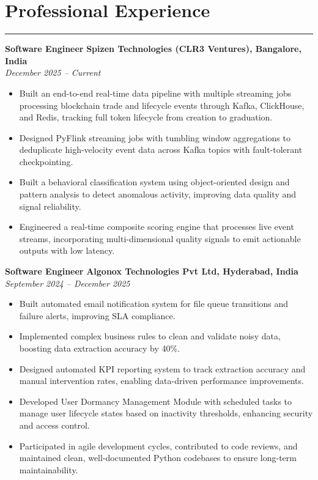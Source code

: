 \documentclass[12pt]{article}
\begin{document}
\section*{Professional Experience}
\vspace{1pt}\hrule\vspace{4pt}

\textbf{Software Engineer} \hfill \textbf{Spizen Technologies (CLR3 Ventures), Bangalore, India} \\
\textit{December 2025 -- Current}
\begin{itemize}
  \item Built an end-to-end real-time data pipeline with multiple streaming jobs processing blockchain trade and lifecycle events through Kafka, ClickHouse, and Redis, tracking full token lifecycle from creation to graduation.
  \item Designed PyFlink streaming jobs with tumbling window aggregations to deduplicate high-velocity event data across Kafka topics with fault-tolerant checkpointing.
  \item Built a behavioral classification system using object-oriented design and pattern analysis to detect anomalous activity, improving data quality and signal reliability.
  \item Engineered a real-time composite scoring engine that processes live event streams, incorporating multi-dimensional quality signals to emit actionable outputs with low latency.
\end{itemize}

\textbf{Software Engineer} \hfill \textbf{Algonox Technologies Pvt Ltd, Hyderabad, India} \\
\textit{September 2024 -- December 2025}
\begin{itemize}
  \item Built automated email notification system for file queue transitions and failure alerts, improving SLA compliance.
  \item Implemented complex business rules to clean and validate noisy data, boosting data extraction accuracy by 40\%.
  \item Designed automated KPI reporting system to track extraction accuracy and manual intervention rates, enabling data-driven performance improvements.
  \item Developed User Dormancy Management Module with scheduled tasks to manage user lifecycle states based on inactivity thresholds, enhancing security and access control.
  \item Participated in agile development cycles, contributed to code reviews, and maintained clean, well-documented Python codebases to ensure long-term maintainability.
\end{itemize}
\end{document}

